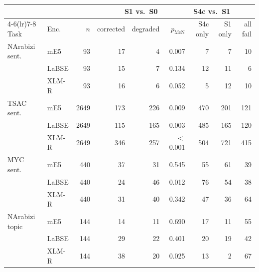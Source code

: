 \begin{tabular}{@{}llrrrrrrr@{}}
\toprule
 & & & \multicolumn{3}{c}{S1 vs.\ S0} & \multicolumn{2}{c}{S4c vs.\ S1} & \\
\cmidrule(lr){4-6}\cmidrule(lr){7-8}
Task & Enc. & $n$ & corrected & degraded & $p_{\mathrm{McN}}$ & S4c only & S1 only & all fail\\
\midrule
NArabizi sent. & mE5 & 93 & 17 & 4 & 0.007 & 7 & 7 & 10 \\
 & LaBSE & 93 & 15 & 7 & 0.134 & 12 & 11 & 6 \\
 & XLM-R & 93 & 16 & 6 & 0.052 & 5 & 12 & 10 \\
\addlinespace
TSAC sent. & mE5 & 2649 & 173 & 226 & 0.009 & 470 & 201 & 121 \\
 & LaBSE & 2649 & 115 & 165 & 0.003 & 485 & 165 & 120 \\
 & XLM-R & 2649 & 346 & 257 & $<$0.001 & 504 & 721 & 415 \\
\addlinespace
MYC sent. & mE5 & 440 & 37 & 31 & 0.545 & 55 & 61 & 39 \\
 & LaBSE & 440 & 24 & 46 & 0.012 & 76 & 54 & 38 \\
 & XLM-R & 440 & 31 & 40 & 0.342 & 47 & 36 & 64 \\
\addlinespace
NArabizi topic & mE5 & 144 & 14 & 11 & 0.690 & 17 & 11 & 55 \\
 & LaBSE & 144 & 29 & 22 & 0.401 & 20 & 19 & 42 \\
 & XLM-R & 144 & 38 & 20 & 0.025 & 13 & 2 & 67 \\
\bottomrule
\end{tabular}

